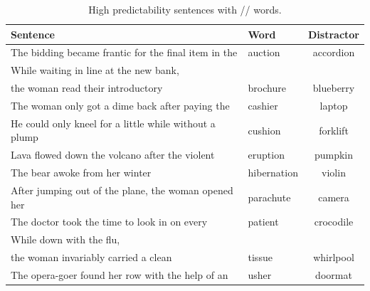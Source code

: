 \begin{table}[!ht]
\caption{High predictability sentences with /\textesh/ words.}
\label{tbl:senthighsh}
\small
\centering
\begin{tabular}{llc}
\toprule
Sentence                                                                     & Word        & Distractor  \\
\midrule
The bidding became frantic for the final item in the                     & auction     & accordion  \\
While waiting in line at the new bank,  & & \\
the woman read their introductory & brochure    & blueberry  \\
The woman only got a dime back after paying the                          & cashier     & laptop     \\
He could only kneel for a little while without a plump                   & cushion     & forklift   \\
Lava flowed down the volcano after the violent                           & eruption    & pumpkin    \\
The bear awoke from her winter                                           & hibernation & violin     \\
After jumping out of the plane, the woman opened her                     & parachute   & camera     \\
The doctor took the time to look in on every                             & patient     & crocodile  \\
While down with the flu, & & \\
 the woman invariably carried a clean            & tissue      & whirlpool  \\
The opera-goer found her row with the help of an                         & usher       & doormat   \\
\bottomrule
\end{tabular}
\end{table}

